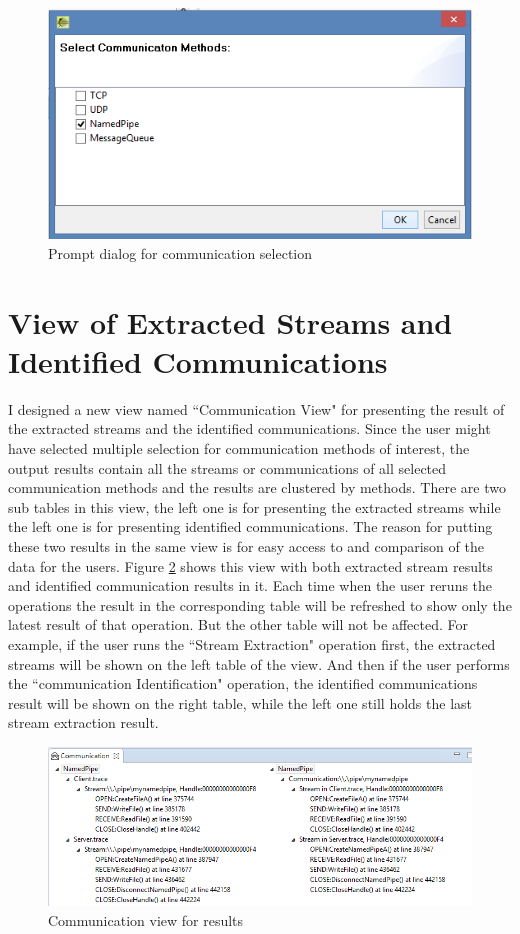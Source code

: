 \begin{figure}[H]
\centerline{\includegraphics[scale=0.8]{Figures/methods}}
 \caption{Prompt dialog for communication selection}
\label{methods}
\end{figure}


\section{View of Extracted Streams and Identified Communications}
I designed a new view named ``Communication View" for presenting the result of the extracted streams and the identified communications. Since the user might have selected multiple selection for communication methods of interest, the output results contain all the streams or communications of all selected communication methods and the results are clustered by methods. There are two sub tables in this view, the left one is for presenting the extracted streams while the left one is for presenting identified communications. The reason for putting these two results in the same view is for easy access to and comparison of the data for the users. Figure \ref{idenview} shows this view with both extracted stream results and identified communication results in it. Each time when the user reruns the operations the result in the corresponding table will be refreshed to show only the latest result of that operation. But the other table will not be affected. For example, if the user runs the ``Stream Extraction" operation first, the extracted streams will be shown on the left table of the view. And then if the user performs the ``communication Identification" operation, the identified communications result will be shown on the right table, while the left one still holds the last stream extraction result.

\begin{figure}[H]
\centerline{\includegraphics[scale=0.7]{Figures/idenview}}
 \caption{Communication view for results}
\label{idenview}
\end{figure}

